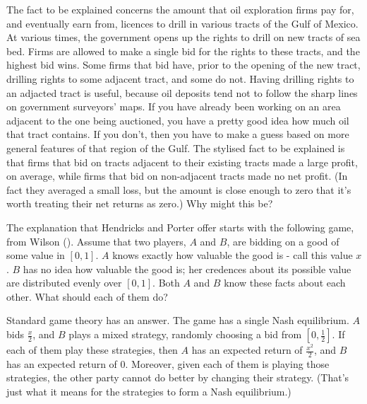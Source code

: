 \documentclass[
  11pt,
  letterpaper,
  DIV=11,
  numbers=noendperiod,
  oneside]{scrartcl}
\begin{document}
The fact to be explained concerns the amount that oil exploration firms
pay for, and eventually earn from, licences to drill in various tracts
of the Gulf of Mexico. At various times, the government opens up the
rights to drill on new tracts of sea bed. Firms are allowed to make a
single bid for the rights to these tracts, and the highest bid wins.
Some firms that bid have, prior to the opening of the new tract,
drilling rights to some adjacent tract, and some do not. Having drilling
rights to an adjacted tract is useful, because oil deposits tend not to
follow the sharp lines on government surveyors' maps. If you have
already been working on an area adjacent to the one being auctioned, you
have a pretty good idea how much oil that tract contains. If you don't,
then you have to make a guess based on more general features of that
region of the Gulf. The stylised fact to be explained is that firms that
bid on tracts adjacent to their existing tracts made a large profit, on
average, while firms that bid on non-adjacent tracts made no net profit.
(In fact they averaged a small loss, but the amount is close enough to
zero that it's worth treating their net returns as zero.) Why might this
be?

The explanation that Hendricks and Porter offer starts with the
following game, from Wilson (). Assume
that two players, \(A\) and \(B\), are bidding on a good of some value
in \([0, 1]\). \(A\) knows exactly how valuable the good is - call this
value \(x\). \(B\) has no idea how valuable the good is; her credences
about its possible value are distributed evenly over \([0, 1]\). Both
\(A\) and \(B\) know these facts about each other. What should each of
them do?

Standard game theory has an answer. The game has a single Nash
equilibrium. \(A\) bids \(\frac{x}{2}\), and \(B\) plays a mixed
strategy, randomly choosing a bid from \([0, \frac{1}{2}]\). If each of
them play these strategies, then \(A\) has an expected return of
\(\frac{x^2}{2}\), and \(B\) has an expected return of 0. Moreover,
given each of them is playing those strategies, the other party cannot
do better by changing their strategy. (That's just what it means for the
strategies to form a Nash equilibrium.)
\end{document}
